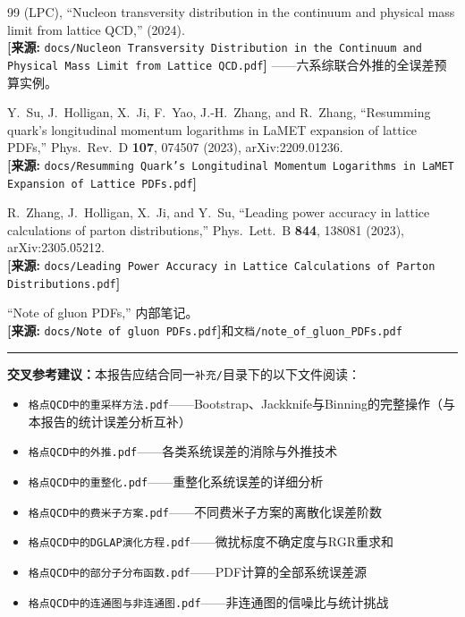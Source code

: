 \documentclass[12pt,a4paper]{ctexart}
\begin{document}
\begin{thebibliography}{99}
(LPC),
``Nucleon transversity distribution in the continuum and physical mass limit from lattice QCD,''
(2024).
\\\textbf{[来源:} \texttt{docs/Nucleon Transversity Distribution in the Continuum and Physical Mass Limit from Lattice QCD.pdf}\textbf{]}
——六系综联合外推的全误差预算实例。

Y.~Su, J.~Holligan, X.~Ji, F.~Yao, J.-H.~Zhang, and R.~Zhang,
``Resumming quark's longitudinal momentum logarithms in LaMET expansion of lattice PDFs,''
Phys.\ Rev.\ D \textbf{107}, 074507 (2023), arXiv:2209.01236.
\\\textbf{[来源:} \texttt{docs/Resumming Quark's Longitudinal Momentum Logarithms in LaMET Expansion of Lattice PDFs.pdf}\textbf{]}

R.~Zhang, J.~Holligan, X.~Ji, and Y.~Su,
``Leading power accuracy in lattice calculations of parton distributions,''
Phys.\ Lett.\ B \textbf{844}, 138081 (2023), arXiv:2305.05212.
\\\textbf{[来源:} \texttt{docs/Leading Power Accuracy in Lattice Calculations of Parton Distributions.pdf}\textbf{]}

``Note of gluon PDFs,'' 内部笔记。
\\\textbf{[来源:} \texttt{docs/Note of gluon PDFs.pdf}\textbf{]}和\texttt{文档/note\_of\_gluon\_PDFs.pdf}

\end{thebibliography}

\vspace{0.5cm}
\noindent\rule{\textwidth}{0.5pt}
\small
\textbf{交叉参考建议：}本报告应结合同一\texttt{补充/}目录下的以下文件阅读：
\begin{itemize}[nosep]
    \item \texttt{格点QCD中的重采样方法.pdf}——Bootstrap、Jackknife与Binning的完整操作（与本报告的统计误差分析互补）
    \item \texttt{格点QCD中的外推.pdf}——各类系统误差的消除与外推技术
    \item \texttt{格点QCD中的重整化.pdf}——重整化系统误差的详细分析
    \item \texttt{格点QCD中的费米子方案.pdf}——不同费米子方案的离散化误差阶数
    \item \texttt{格点QCD中的DGLAP演化方程.pdf}——微扰标度不确定度与RGR重求和
    \item \texttt{格点QCD中的部分子分布函数.pdf}——PDF计算的全部系统误差源
    \item \texttt{格点QCD中的连通图与非连通图.pdf}——非连通图的信噪比与统计挑战
\end{itemize}
\end{document}

